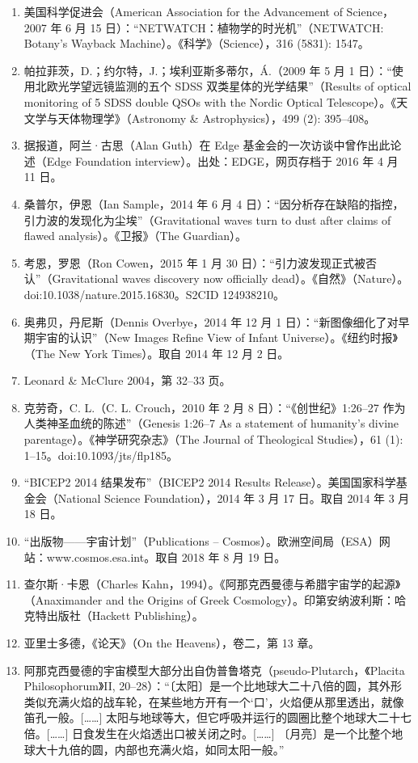 \begin{enumerate}
\item 美国科学促进会（American Association for the Advancement of Science，2007 年 6 月 15 日）：“NETWATCH：植物学的时光机”（NETWATCH: Botany's Wayback Machine）。《科学》（Science），316 (5831): 1547。  
\item 帕拉菲茨，D.；约尔特，J.；埃利亚斯多蒂尔，Á.（2009 年 5 月 1 日）：“使用北欧光学望远镜监测的五个 SDSS 双类星体的光学结果”（Results of optical monitoring of 5 SDSS double QSOs with the Nordic Optical Telescope）。《天文学与天体物理学》（Astronomy & Astrophysics），499 (2): 395–408。
\item 据报道，阿兰·古思（Alan Guth）在 Edge 基金会的一次访谈中曾作出此论述（Edge Foundation interview）。出处：EDGE，网页存档于 2016 年 4 月 11 日。  
\item 桑普尔，伊恩（Ian Sample，2014 年 6 月 4 日）：“因分析存在缺陷的指控，引力波的发现化为尘埃”（Gravitational waves turn to dust after claims of flawed analysis）。《卫报》（The Guardian）。  
\item 考恩，罗恩（Ron Cowen，2015 年 1 月 30 日）：“引力波发现正式被否认”（Gravitational waves discovery now officially dead）。《自然》（Nature）。doi:10.1038/nature.2015.16830。S2CID 124938210。  
\item 奥弗贝，丹尼斯（Dennis Overbye，2014 年 12 月 1 日）：“新图像细化了对早期宇宙的认识”（New Images Refine View of Infant Universe）。《纽约时报》（The New York Times）。取自 2014 年 12 月 2 日。  
\item Leonard & McClure 2004，第 32–33 页。  
\item 克劳奇，C. L.（C. L. Crouch，2010 年 2 月 8 日）：“《创世纪》1:26–27 作为人类神圣血统的陈述”（Genesis 1:26–7 As a statement of humanity's divine parentage）。《神学研究杂志》（The Journal of Theological Studies），61 (1): 1–15。doi:10.1093/jts/flp185。  
\item “BICEP2 2014 结果发布”（BICEP2 2014 Results Release）。美国国家科学基金会（National Science Foundation），2014 年 3 月 17 日。取自 2014 年 3 月 18 日。  
\item “出版物——宇宙计划”（Publications – Cosmos）。欧洲空间局（ESA）网站：www.cosmos.esa.int。取自 2018 年 8 月 19 日。  
\item 查尔斯·卡恩（Charles Kahn，1994）。《阿那克西曼德与希腊宇宙学的起源》（Anaximander and the Origins of Greek Cosmology）。印第安纳波利斯：哈克特出版社（Hackett Publishing）。  
\item 亚里士多德，《论天》（On the Heavens），卷二，第 13 章。  
\item 阿那克西曼德的宇宙模型大部分出自伪普鲁塔克（pseudo-Plutarch，《Placita Philosophorum》II, 20–28）：“〔太阳〕是一个比地球大二十八倍的圆，其外形类似充满火焰的战车轮，在某些地方开有一个‘口’，火焰便从那里透出，就像笛孔一般。[……] 太阳与地球等大，但它呼吸并运行的圆圈比整个地球大二十七倍。[……] 日食发生在火焰透出口被关闭之时。[……] 〔月亮〕是一个比整个地球大十九倍的圆，内部也充满火焰，如同太阳一般。”



\end{enumerate}

